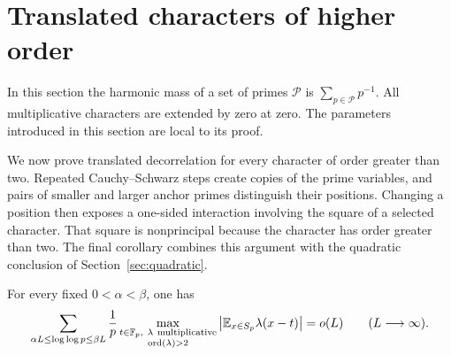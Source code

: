 \section{Translated characters of higher order}\label{sec:characters}

In this section the harmonic mass of a set of primes \(\mathcal P\) is
\(\sum_{p\in\mathcal P}p^{-1}\). All multiplicative characters are
extended by zero at zero. The parameters introduced in this section
are local to its proof.

We now prove translated decorrelation for every character of order
greater than two. Repeated Cauchy--Schwarz steps create copies of
the prime variables, and pairs of smaller and larger anchor primes
distinguish their positions. Changing a position then exposes a
one-sided interaction involving the square of a selected character.
That square is nonprincipal because the character has order greater
than two. The final corollary combines this argument with the
quadratic conclusion of Section~\ref{sec:quadratic}.

\begin{proposition}\label{prop:characters}
For every fixed \(0<\alpha<\beta\), one has
\begin{equation}\label{eq:src16}
 \sum_{\alpha L\le \log\log p\le\beta L}\frac1p
 \max_{\substack{t\in\mathbb F_p,\ \lambda\ {\rm multiplicative}\\
                  \operatorname{ord}(\lambda)>2}}
 \left|\mathbb E_{x\in S_p}\lambda(x-t)\right|=o(L)
 \qquad(L\longrightarrow\infty).
\end{equation}
\end{proposition}

